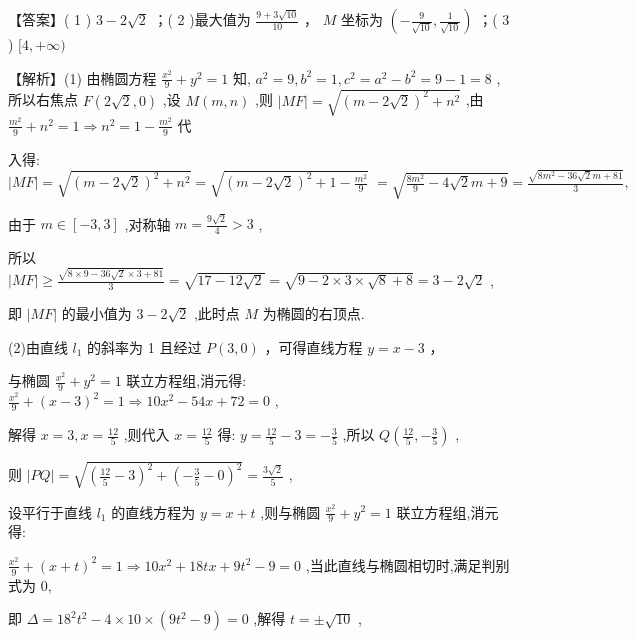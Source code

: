 \documentclass[10pt]{article}
\begin{document}
【答案】( 1 ) \(3 - 2\sqrt{2}\) ；( 2 )最大值为 \(\frac{9 + 3\sqrt{10}}{10}\) ， \(M\) 坐标为 \(\left( {-\frac{9}{\sqrt{10}},\frac{1}{\sqrt{10}}}\right)\) ；( 3 ) \(\lbrack 4, + \infty )\)

【解析】(1) 由椭圆方程 \(\frac{{x}^{2}}{9} + {y}^{2} = 1\) 知, \({a}^{2} = 9,{b}^{2} = 1,{c}^{2} = {a}^{2} - {b}^{2} = 9 - 1 = 8\) ,所以右焦点 \(F\left( {2\sqrt{2},0}\right)\) ,设 \(M\left( {m,n}\right)\) ,则 \(\left| {MF}\right|  = \sqrt{{\left( m - 2\sqrt{2}\right) }^{2} + {n}^{2}}\) ,由 \(\frac{{m}^{2}}{9} + {n}^{2} = 1 \Rightarrow  {n}^{2} = 1 - \frac{{m}^{2}}{9}\) 代

入得: \(\left| {MF}\right|  = \sqrt{{\left( m - 2\sqrt{2}\right) }^{2} + {n}^{2}} = \sqrt{{\left( m - 2\sqrt{2}\right) }^{2} + 1 - \frac{{m}^{2}}{9}} \; = \sqrt{\frac{8{m}^{2}}{9} - 4\sqrt{2}m + 9} = \frac{\sqrt{8{m}^{2} - {36}\sqrt{2}m + {81}}}{3},\)

由于 \(m \in  \left\lbrack  {-3,3}\right\rbrack\) ,对称轴 \(m = \frac{9\sqrt{2}}{4} > 3\) ,

所以 \(\left| {MF}\right|  \geq  \frac{\sqrt{8 \times  9 - {36}\sqrt{2} \times  3 + {81}}}{3} = \sqrt{{17} - {12}\sqrt{2}} = \sqrt{9 - 2 \times  3 \times  \sqrt{8} + 8} = 3 - 2\sqrt{2}\) ,

即 \(\left| {MF}\right|\) 的最小值为 \(3 - 2\sqrt{2}\) ,此时点 \(M\) 为椭圆的右顶点.

(2)由直线 \({l}_{1}\) 的斜率为 1 且经过 \(P\left( {3,0}\right)\) ，可得直线方程 \(y = x - 3\) ，

与椭圆 \(\frac{{x}^{2}}{9} + {y}^{2} = 1\) 联立方程组,消元得: \(\frac{{x}^{2}}{9} + {\left( x - 3\right) }^{2} = 1 \Rightarrow  {10}{x}^{2} - {54x} + {72} = 0\) ,

解得 \(x = 3,x = \frac{12}{5}\) ,则代入 \(x = \frac{12}{5}\) 得: \(y = \frac{12}{5} - 3 =  - \frac{3}{5}\) ,所以 \(Q\left( {\frac{12}{5}, - \frac{3}{5}}\right)\) ,

则 \(\left| {PQ}\right|  = \sqrt{{\left( \frac{12}{5} - 3\right) }^{2} + {\left( -\frac{3}{5} - 0\right) }^{2}} = \frac{3\sqrt{2}}{5}\) ,

设平行于直线 \({l}_{1}\) 的直线方程为 \(y = x + t\) ,则与椭圆 \(\frac{{x}^{2}}{9} + {y}^{2} = 1\) 联立方程组,消元得:

\(\frac{{x}^{2}}{9} + {\left( x + t\right) }^{2} = 1 \Rightarrow  {10}{x}^{2} + {18tx} + 9{t}^{2} - 9 = 0\) ,当此直线与椭圆相切时,满足判别式为 0,

即 \(\Delta  = {18}^{2}{t}^{2} - 4 \times  {10} \times  \left( {9{t}^{2} - 9}\right)  = 0\) ,解得 \(t =  \pm  \sqrt{10}\) ,
\end{document}

